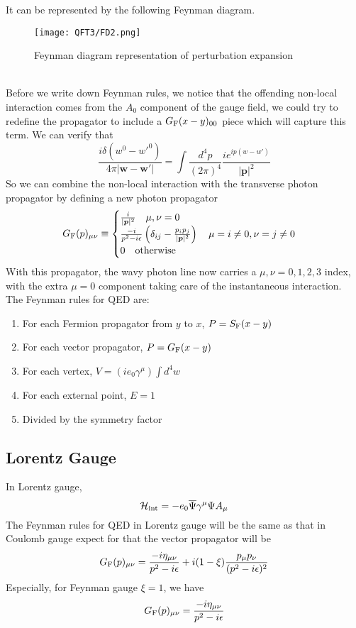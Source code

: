 It can be represented by the following Feynman diagram.
\begin{figure}[!h]
\centering
\texttt{[image: QFT3/FD2.png]}
\caption{Feynman diagram representation of perturbation expansion}
\end{figure}\\
Before we write down Feynman rules, we notice that the offending non-local interaction comes from the $A_0$ component of the gauge field, we could try to redefine the propagator to include a $G_{\rm F}(x-y)_{00}$ piece which will capture this term. We can verify that
\[\frac{i\delta(w^0-w'^0)}{4\pi|\bm{w}-\bm{w}'|} = \int \frac{d^4p}{(2\pi)^4} \frac{ie^{ip(w-w')}}{|\bm{p}|^2}\]
So we can combine the non-local interaction with the transverse photon propagator by defining a new photon propagator
\[G_{\rm F}(p)_{\mu\nu} \equiv \begin{cases} \frac{i}{|\bm{p}|^2} \quad \mu,\nu=0\\  \frac{-i}{p^2-i\epsilon} \left(\delta_{ij} - \frac{p_ip_j}{|\bm{p}|^2}\right) \quad \mu = i \neq 0, \nu = j \neq 0 \\ 0 \quad \mbox{otherwise} \end{cases} \]
With this propagator, the wavy photon line now carries a $\mu,\nu = 0,1,2,3$ index, with the extra $\mu=0$ component taking care of the instantaneous interaction.\\
The Feynman rules for QED are:
\begin{enumerate}
\item For each Fermion propagator from $y$ to $x$, $P = S_{\rm F}(x-y)$
\item For each vector propagator, $P = G_{\rm F}(x-y)$
\item For each vertex, $V = (ie_0\gamma^{\mu})\int d^4w$
\item For each external point, $E=1$
\item Divided by the symmetry factor
\end{enumerate}

\subsection{Lorentz Gauge}
\noindent
In Lorentz gauge,
\[\mathcal{H}_{\rm int} = -e_0 \overline{\Psi} \gamma^{\mu} \Psi A_{\mu}\]
The Feynman rules for QED in Lorentz gauge will be the same as that in Coulomb gauge expect for that the vector propagator will be
\[G_{\rm F}(p)_{\mu\nu}  = \frac{-i\eta_{\mu\nu}}{p^2-i\epsilon} + i(1-\xi)\frac{p_{\mu}p_{\nu}}{(p^2-i\epsilon)^2} \]
Especially, for Feynman gauge $\xi=1$, we have
\[G_{\rm F}(p)_{\mu\nu}  = \frac{-i\eta_{\mu\nu}}{p^2-i\epsilon} \]

